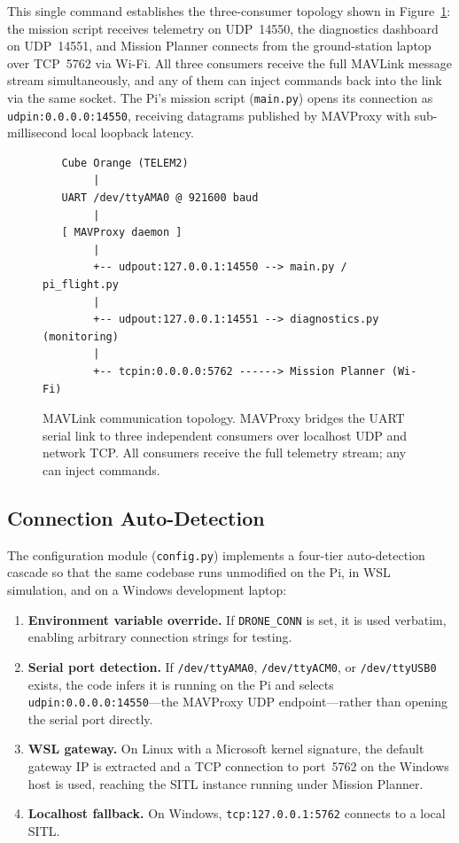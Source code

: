 \noindent This single command establishes the three-consumer topology shown in Figure~\ref{fig:comms-topology}: the mission script receives telemetry on UDP~14550, the diagnostics dashboard on UDP~14551, and Mission Planner connects from the ground-station laptop over TCP~5762 via Wi-Fi. All three consumers receive the full MAVLink message stream simultaneously, and any of them can inject commands back into the link via the same socket. The Pi's mission script (\texttt{main.py}) opens its connection as \texttt{udpin:0.0.0.0:14550}, receiving datagrams published by MAVProxy with sub-millisecond local loopback latency.

\begin{figure}[ht]
  \centering
  \begin{minipage}{0.85\linewidth}
  \small
  \begin{verbatim}
   Cube Orange (TELEM2)
        |
   UART /dev/ttyAMA0 @ 921600 baud
        |
   [ MAVProxy daemon ]
        |
        +-- udpout:127.0.0.1:14550 --> main.py / pi_flight.py
        |
        +-- udpout:127.0.0.1:14551 --> diagnostics.py (monitoring)
        |
        +-- tcpin:0.0.0.0:5762 ------> Mission Planner (Wi-Fi)
  \end{verbatim}
  \end{minipage}
  \caption{MAVLink communication topology. MAVProxy bridges the UART serial link to three independent consumers over localhost UDP and network TCP. All consumers receive the full telemetry stream; any can inject commands.}
  \label{fig:comms-topology}
\end{figure}

\subsection{Connection Auto-Detection}\label{sec:auto-detect}

The configuration module (\texttt{config.py}) implements a four-tier auto-detection cascade so that the same codebase runs unmodified on the Pi, in WSL simulation, and on a Windows development laptop:

\begin{enumerate}
  \item \textbf{Environment variable override.} If \texttt{DRONE\_CONN} is set, it is used verbatim, enabling arbitrary connection strings for testing.
  \item \textbf{Serial port detection.} If \texttt{/dev/ttyAMA0}, \texttt{/dev/ttyACM0}, or \texttt{/dev/ttyUSB0} exists, the code infers it is running on the Pi and selects \texttt{udpin:0.0.0.0:14550}---the MAVProxy UDP endpoint---rather than opening the serial port directly.
  \item \textbf{WSL gateway.} On Linux with a Microsoft kernel signature, the default gateway IP is extracted and a TCP connection to port~5762 on the Windows host is used, reaching the SITL instance running under Mission Planner.
  \item \textbf{Localhost fallback.} On Windows, \texttt{tcp:127.0.0.1:5762} connects to a local SITL.
\end{enumerate}

